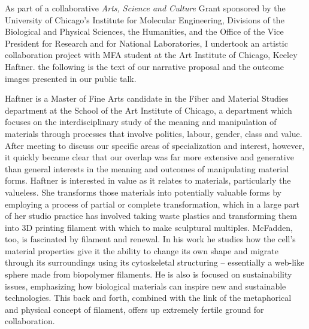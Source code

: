 As part of a collaborative \textit{Arts, Science and Culture} Grant sponsored by the University of Chicago's Institute for Molecular Engineering, Divisions of the Biological and Physical Sciences, the Humanities, and the Office of the Vice President for Research and for National Laboratories, I undertook an artistic collaboration project with MFA student at the Art Institute of Chicago, Keeley Haftner.  the following is the text of our narrative proposal and the outcome images presented in our public talk.

Haftner is a Master of Fine Arts candidate in the Fiber and Material Studies department at the School of the Art Institute of Chicago, a department which focuses on the interdisciplinary study of the meaning and manipulation of materials through processes that involve politics, labour, gender, class and value. After meeting to discuss our specific areas of specialization and interest, however, it quickly became clear that our overlap was far more extensive and generative than general interests in the meaning and outcomes of manipulating material forms. Haftner is interested in value as it relates to materials, particularly the valueless. She transforms those materials into potentially valuable forms by employing a process of partial or complete transformation, which in a large part of her studio practice has involved taking waste plastics and transforming them into 3D printing filament with which to make sculptural multiples. McFadden, too, is fascinated by filament and renewal. In his work he studies how the cell's material properties give it the ability to change its own shape and migrate through its surroundings using its cytoskeletal structuring – essentially a web-like sphere made from biopolymer filaments. He is also is focused on sustainability issues, emphasizing how biological materials can inspire new and sustainable technologies. This back and forth, combined with the link of the metaphorical and physical concept of filament, offers up extremely fertile ground for collaboration.

